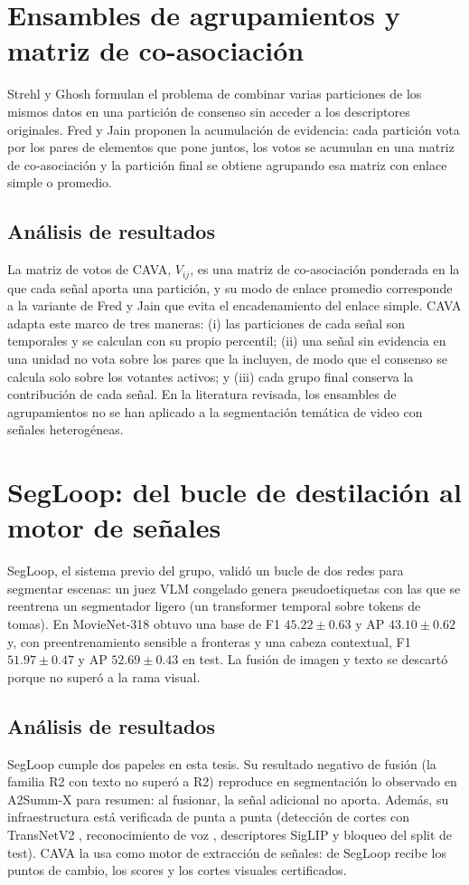 \section{Ensambles de agrupamientos y matriz de co-asociación}

Strehl y Ghosh \cite{strehl2002cluster} formulan el problema de combinar varias particiones
de los mismos datos en una partición de consenso sin acceder a los descriptores originales.
Fred y Jain \cite{fred2005evidence} proponen la acumulación de evidencia: cada partición vota
por los pares de elementos que pone juntos, los votos se acumulan en una matriz de
co-asociación y la partición final se obtiene agrupando esa matriz con enlace simple o
promedio.

\subsection{Análisis de resultados}
La matriz de votos de CAVA, $V_{ij}$, es una matriz de co-asociación ponderada en la que cada
señal aporta una partición, y su modo de enlace promedio corresponde a la variante de Fred y
Jain que evita el encadenamiento del enlace simple. CAVA adapta este marco de tres maneras:
(i) las particiones de cada señal son temporales y se calculan con su propio percentil; (ii)
una señal sin evidencia en una unidad no vota sobre los pares que la incluyen, de modo que el
consenso se calcula solo sobre los votantes activos; y (iii) cada grupo final conserva la
contribución de cada señal. En la literatura revisada, los ensambles de agrupamientos no se
han aplicado a la segmentación temática de video con señales heterogéneas.

\section{SegLoop: del bucle de destilación al motor de señales}

SegLoop, el sistema previo del grupo, validó un bucle de dos redes para segmentar escenas: un
juez VLM congelado genera pseudoetiquetas con las que se reentrena un segmentador ligero (un
transformer temporal sobre tokens de tomas). En MovieNet-318 obtuvo una base de F1 $45.22 \pm
0.63$ y AP $43.10 \pm 0.62$ y, con preentrenamiento sensible a fronteras y una cabeza
contextual, F1 $51.97 \pm 0.47$ y AP $52.69 \pm 0.43$ en test. La fusión de imagen y texto
se descartó porque no superó a la rama visual.

\subsection{Análisis de resultados}
SegLoop cumple dos papeles en esta tesis. Su resultado negativo de fusión (la familia R2 con
texto no superó a R2) reproduce en segmentación lo observado en A2Summ-X para resumen: al
fusionar, la señal adicional no aporta. Además, su infraestructura está verificada de punta a
punta (detección de cortes con TransNetV2 \cite{soucekl2020transnetv2}, reconocimiento de voz
\cite{radford2023whisper}, descriptores SigLIP \cite{zhai2023siglip} y bloqueo del split de
test). CAVA la usa como motor de extracción de señales: de SegLoop recibe los puntos de cambio, los
scores y los cortes visuales certificados.

